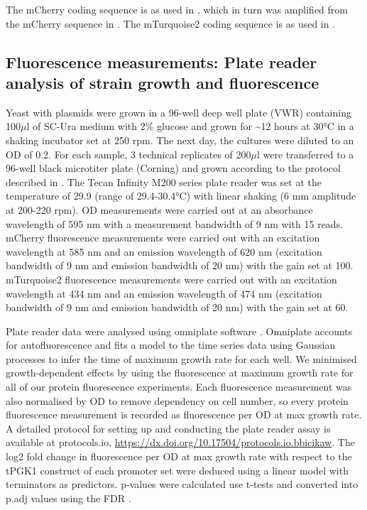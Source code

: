\documentclass[../main.tex]{subfiles}
\begin{document}
The mCherry coding sequence is as used in \parencite{Garcia2018}, which in turn was amplified from the mCherry sequence in \parencite{Sharon2012}.
The mTurquoise2 coding sequence is as used in \parencite{Lee2015}.


\subsection{Fluorescence measurements: Plate reader analysis of strain growth and fluorescence}

Yeast with plasmids were grown in a 96-well deep well plate (VWR) containing 100\(\mu\)l of SC-Ura medium with 2\% glucose and grown for \textasciitilde12 hours at 30°C in a shaking incubator set at 250 rpm.
The next day, the cultures were diluted to an OD of 0.2. For each sample, 3 technical replicates of 200\(\mu\)l were transferred to a 96-well black microtiter plate (Corning) and grown according to the protocol described in \parencite{Lichten2014}.
The Tecan Infinity M200 series plate reader was set at the temperature of 29.9 (range of 29.4-30.4°C) with linear shaking (6 mm amplitude at 200-220 rpm).
OD measurements were carried out at an absorbance wavelength of 595 nm with a measurement bandwidth of 9 nm with 15 reads. mCherry fluorescence measurements were carried out with an excitation wavelength at 585 nm and an emission wavelength of 620 nm (excitation bandwidth of 9 nm and emission bandwidth of 20 nm) with the gain set at 100.
mTurquoise2 fluorescence measurements were carried out with an excitation wavelength at 434 nm and an emission wavelength of 474 nm (excitation bandwidth of 9 nm and emission bandwidth of 20 nm) with the gain set at 60.

Plate reader data were analysed using omniplate software \parencite{Swain2016}.
Omniplate accounts for autofluorescence and fits a model to the time series data using Gaussian processes to infer the time of maximum growth rate for each well.
We minimised growth-dependent effects by using the fluorescence at maximum growth rate for all of our protein fluorescence experiments.
Each fluorescence measurement was also normalised by OD to remove dependency on cell number, so every protein fluorescence measurement is recorded as fluorescence per OD at max growth rate.
A detailed protocol for setting up and conducting the plate reader assay is available at protocols.io, \url{https://dx.doi.org/10.17504/protocols.io.bbicikaw}.
The log2 fold change in fluorescence per OD at max growth rate with respect to the tPGK1 construct of each promoter set were deduced using a linear model with terminators as predictors. 
p-values were calculated use t-tests and converted into p.adj values using the FDR \parencite{Benjamini1995}.
\end{document}
